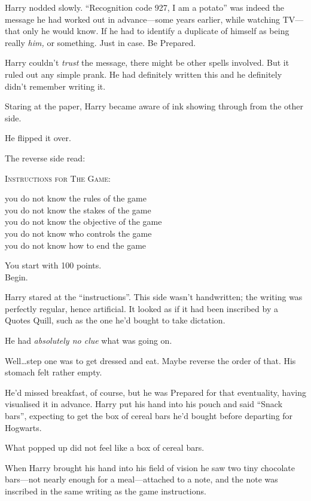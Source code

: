Harry nodded slowly. “Recognition code 927, I am a potato” was indeed the message he had worked out in advance—some years earlier, while watching TV—that only he would know. If he had to identify a duplicate of himself as being really \emph{him,} or something. Just in case. Be Prepared.

Harry couldn’t \emph{trust} the message, there might be other spells involved. But it ruled out any simple prank. He had definitely written this and he definitely didn’t remember writing it.

Staring at the paper, Harry became aware of ink showing through from the other side.

He flipped it over.

The reverse side read:

\begin{writtenNote}\centering
\textsc{Instructions for The Game:}

you do not know the rules of the game\\
you do not know the stakes of the game\\
you do not know the objective of the game\\
you do not know who controls the game\\
you do not know how to end the game

You start with 100 points.\\
Begin.
\end{writtenNote}

Harry stared at the “instructions”. This side wasn’t handwritten; the writing was perfectly regular, hence artificial. It looked as if it had been inscribed by a Quotes Quill, such as the one he’d bought to take dictation.

He had \emph{absolutely no clue} what was going on.

Well…step one was to get dressed and eat. Maybe reverse the order of that. His stomach felt rather empty.

He’d missed breakfast, of course, but he was Prepared for that eventuality, having visualised it in advance. Harry put his hand into his pouch and said “Snack bars”, expecting to get the box of cereal bars he’d bought before departing for Hogwarts.

What popped up did not feel like a box of cereal bars.

When Harry brought his hand into his field of vision he saw two tiny chocolate bars—not nearly enough for a meal—attached to a note, and the note was inscribed in the same writing as the game instructions.

